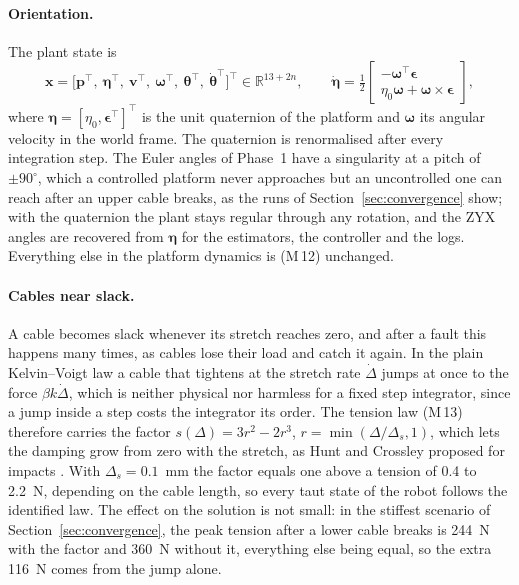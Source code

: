 \documentclass[10pt]{article}
\newcommand{\vc}[1]{\bm{#1}}
\begin{document}
\paragraph{Orientation.} The plant state is
\begin{equation}\label{eq:state}
\vc x=\big[\vc p^\top,\ \vc\eta^\top,\ \vc v^\top,\ \vc\omega^\top,\ \vc\theta^\top,\ \dot{\vc\theta}^\top\big]^\top\in\mathbb R^{13+2n},
\qquad
\dot{\vc\eta}=\tfrac12\begin{bmatrix}-\vc\omega^\top\vc\epsilon\\ \eta_0\vc\omega+\vc\omega\times\vc\epsilon\end{bmatrix},
\end{equation}
where $\vc\eta=[\eta_0,\vc\epsilon^\top]^\top$ is the unit quaternion of the platform and $\vc\omega$ its angular velocity in the world frame. The quaternion is renormalised after every integration step. The Euler angles of Phase~1 have a singularity at a pitch of $\pm90^\circ$, which a controlled platform never approaches but an uncontrolled one can reach after an upper cable breaks, as the runs of Section~\ref{sec:convergence} show; with the quaternion the plant stays regular through any rotation, and the ZYX angles are recovered from $\vc\eta$ for the estimators, the controller and the logs. Everything else in the platform dynamics is (M\,12) unchanged.

\paragraph{Cables near slack.} A cable becomes slack whenever its stretch reaches zero, and after a fault this happens many times, as cables lose their load and catch it again. In the plain Kelvin--Voigt law a cable that tightens at the stretch rate $\dot\Delta$ jumps at once to the force $\beta k\dot\Delta$, which is neither physical nor harmless for a fixed step integrator, since a jump inside a step costs the integrator its order. The tension law (M\,13) therefore carries the factor $s(\Delta)=3r^2-2r^3$, $r=\min(\Delta/\Delta_s,1)$, which lets the damping grow from zero with the stretch, as Hunt and Crossley proposed for impacts \citep{hunt1975coefficient}. With $\Delta_s=0.1$~mm the factor equals one above a tension of 0.4 to 2.2~N, depending on the cable length, so every taut state of the robot follows the identified law. The effect on the solution is not small: in the stiffest scenario of Section~\ref{sec:convergence}, the peak tension after a lower cable breaks is 244~N with the factor and 360~N without it, everything else being equal, so the extra 116~N comes from the jump alone.
\end{document}
